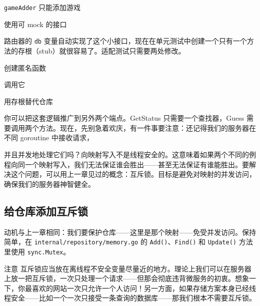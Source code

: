 \begin{codeannotations}
\item \texttt{gameAdder} 只能添加游戏
\item 使用可 mock 的接口
\end{codeannotations}

路由器的 \texttt{db} 变量自动实现了这个小接口，现在在单元测试中创建一个只有一个方法的存根（stub）就很容易了。适配测试只需要两处修改。


\begin{codeannotations}
\item 创建匿名函数
\item 调用它
\item 用存根替代仓库
\end{codeannotations}

你可以把这套逻辑推广到另外两个端点。GetStatus 只需要一个查找器，Guess 需要调用两个方法。现在，先别急着欢庆，有一件事要注意：还记得我们的服务器在不同 goroutine 中接收请求，

并且并发地处理它们吗？向映射写入不是线程安全的。这意味着如果两个不同的例程向同一个映射写入，我们无法保证谁会胜出——甚至无法保证有谁能胜出。要解决这个问题，可以用上一章见过的概念：互斥锁。目标是避免对映射的并发访问，确保我们的服务器神智健全。

\subsection{给仓库添加互斥锁}

动机与上一章相同：我们要保护仓库——这里是那个映射——免受并发访问。保持简单，在 \texttt{internal/repository/memory.go} 的 \texttt{Add()}、\texttt{Find()} 和 \texttt{Update()} 方法里使用 \texttt{sync.Mutex}。

\begin{infobox}{注意}
互斥锁应当放在离线程不安全变量尽量近的地方。理论上我们可以在服务器上放一把互斥锁，一次只处理一个请求——但那会彻底违背微服务的初衷。想象一下，你最喜欢的网站一次只允许一个人访问！另一方面，如果存储方案本身已经线程安全——比如一个一次只接受一条查询的数据库——那我们根本不需要互斥锁。
\end{infobox}

